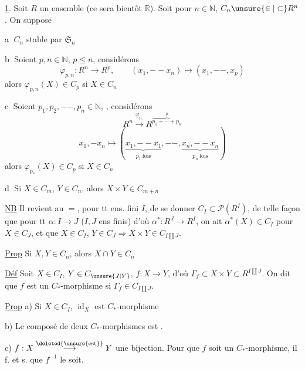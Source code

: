 \uline{1}. Soit $R$ un ensemble (ce sera bientôt $\mathbb R$). 
Soit pour  $n\in\mathbb N$, $C_n\unsure{\in|\subset}R^n$. On suppose

\textcircled{a} $C_n$ stable par $\mathfrak S_n$

\textcircled{b} Soient $p,n\in\mathbb N$, $p\leq n$, considérons
\[
\varphi_{p,n}:R^n\longrightarrow R^p,\qquad
(x_1,--x_n)\longmapsto(x_1,--,x_p)
\]
alors $\varphi_{p,n}(X)\in C_p$ si $X\in C_n$

\textcircled{c} Soient $p_1,p_2,--,p_n\in\mathbb N$, , considérons
\[
R^n\xrightarrow{\varphi_{p_*}}R^{\overbrace{p_1+\cdots+p_n}^{p}}
\]
\[
x_1,-x_n\longmapsto
(\underbrace{x_1,--x_1}_{p_1\ \mathrm{fois}},--,\underbrace{x_n,--x_n}_{p_n\ \mathrm{fois}})
\]
alors $\varphi_{p_*}(X)\in C_p$ si $X\in C_n$

\textcircled{d} Si $X\in C_m$, $Y\in C_n$, alors $X\times Y\in C_{m+n}$

\uline{NB} Il revient au $=$, pour tt ens. fini $I$, de se donner  $C_I\subset\mathcal P(R^I)$, de telle façon que pour tt $\alpha:I\to J$ ($I,J$ ens finis) d'où $\alpha^*:R^J\to R^I$, on ait $\alpha^*(X)\in C_I$ pour $X\in C_J$, et que $X\in C_I$, $Y\in C_J\Rightarrow X\times Y\in C_{I\amalg J}$.

\uline{Prop} Si $X,Y\in C_n$, alors $X\cap Y\in C_n$

\uline{Déf} Soit $X\in C_I$, $Y\in C_{\unsure{J|Y}}$, $f:X\to Y$, d'où $\Gamma_f\subset X\times Y\subset R^{I\amalg J}$. On dit que $f$ est un $C_*$-morphisme si $\Gamma_f\in C_{I\amalg J}$.


\uline{Prop} a) Si $X\in C_I$, $\operatorname{id}_X$ est $C_*$-morphisme

b) Le composé de deux $C_*$-morphismes est .

c)  $f:X\overset{\deleted{\unsure{\text{est}}}}{\longrightarrow}Y$ une bijection. Pour que $f$ soit un $C_*$-morphisme, il f. et s. que $f^{-1}$ le soit.

